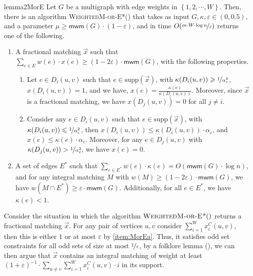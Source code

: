 \documentclass[a4paper,11pt]{article}
\newcommand{\set}[1]{\ensuremath{\left\{ #1 \right\}}}
\newcommand{\eps}{\varepsilon}
\theoremstyle{definition}
\theoremstyle{definition}
\theoremstyle{definition}
\theoremstyle{definition}
\theoremstyle{definition}
\theoremstyle{definition}
\theoremstyle{definition}
\theoremstyle{definition}
\theoremstyle{definition}
\theoremstyle{definition}
\theoremstyle{definition}
\theoremstyle{definition}
\theoremstyle{definition}
\theoremstyle{definition}
\theoremstyle{definition}
\begin{document}
\begin{restatable}{lemma2}{MorE}\label{lem:MorE}
Let $G$ be a multigraph with edge weights in $\set{1,2,\cdots, W}$. Then, there is an algorithm \textsc{WeightedM-or-E*}() that takes as input $G,\kappa, \eps\in (0,0.5)$, and a parameter $\mu\geqslant \textsf{mwm}(G)\cdot (1-\eps)$, and in time $O(\nicefrac{m\cdot W\cdot \log n}{\eps})$ returns one of the following.
\begin{enumerate}
\item A fractional matching $\vec{x}$ such that $\sum_{e\in E}w(e)\cdot x(e)\geqslant (1-2\eps)\cdot \textsf{mwm}(G)$, with the following properties. \label{item:MorEa}
\begin{enumerate}[label=(\roman*)]
\item Let $e\in D_{i}(u,v)$ such that $e\in \text{supp}(\vec{x})$, with $\kappa(D_i(u,v))\geqslant \nicefrac{1}{\alpha_{\eps}^2}$, $x(D_i(u,v))=1$, and we have, $x(e)=\frac{\kappa(e)}{\kappa(D_i(u,v))}$. Moreover, since $\vec{x}$ is a fractional matching, we have $x(D_j(u,v))=0$ for all $j\neq i$. \label{item:MorEai}
\item Consider any $e\in D_{i}(u,v)$ such that $e\in \text{supp}(\vec{x})$, with $\kappa(D_i(u,v))\leqslant \nicefrac{1}{\alpha_{\eps}^2}$, then $x(D_i(u,v))\leqslant \kappa(D_i(u,v))\cdot \alpha_{\eps}$, and $x(e)\leqslant \kappa(e)\cdot \alpha_{\eps}$. Moreover, for any $e\in D_j(u,v)$ with $\kappa(D_j(u,v))>\nicefrac{1}{\alpha_{\eps}^2}$, we have $x(e)=0$.\label{item:MorEaii}
\end{enumerate}
\item A set of edges $E^*$ such that $\sum_{e\in E^*}w(e)\cdot \kappa(e)=O(\textsf{mwm}(G)\cdot \log n)$, and for any integral matching $M$ with $w(M)\geqslant (1-2\eps)\cdot \textsf{mwm}(G)$, we have $w(M\cap E^*)\geqslant \eps\cdot \textsf{mwm}(G)$. Additionally, for all $e\in E^*$, we have $\kappa(e)<1$. \label{item:MorEb}
\end{enumerate}
\end{restatable} 

Consider the situation in which the algorithm $\textsc{WeightedM-or-E*}()$ returns a fractional matching $\vec{x}$. For any pair of vertices $u,v$ consider $\sum_{i=1}^W x_{i}^C(u,v)$, then this is either $1$ or at most $\eps$ by \ref{item:MorEa}. Thus, it satisfies odd set constraints for all odd sets of size at most $\nicefrac{1}{\eps}$, by a folklore lemma (), we can then argue that $\vec{x}$ contains an integral matching of weight at least $(1+\eps)^{-1}\cdot \sum_{u\neq v}\sum_{i=1}^W x^{C}_{i}(u,v)\cdot i$ in its support. 
\end{document}
